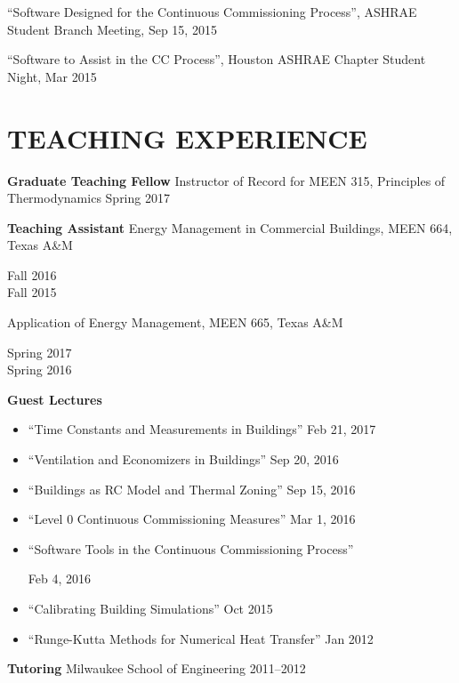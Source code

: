 \documentclass[margin]{res} %
\begin{document}
\begin{resume}
``Software Designed for the Continuous Commissioning Process'', ASHRAE Student Branch Meeting, Sep 15, 2015

``Software to Assist in the CC Process'', Houston ASHRAE Chapter Student Night, Mar 2015


\section{TEACHING EXPERIENCE}
\textbf{Graduate Teaching Fellow} \newline
Instructor of Record for MEEN 315, Principles of Thermodynamics \hfill Spring 2017

\textbf{Teaching Assistant}\newline
Energy Management in Commercial Buildings, MEEN 664, Texas A\&M \hfill \parbox[t]{1.5cm}{\raggedleft Fall 2016 \\ Fall 2015} \par

\vspace{10pt}

Application of Energy Management, MEEN 665, Texas A\&M \hfill \parbox[t]{2cm}{\raggedleft Spring 2017 \\ Spring 2016}

\vspace{10pt}
\textbf{Guest Lectures}
\begin{itemize}
    \item ``Time Constants and Measurements in Buildings'' \hfill Feb 21, 2017
    \item ``Ventilation and Economizers in Buildings'' \hfill Sep 20, 2016
    \item ``Buildings as RC Model and Thermal Zoning'' \hfill Sep 15, 2016
    \item ``Level 0 Continuous Commissioning Measures'' \hfill Mar 1, 2016
    \item  \parbox{10cm}{``Software Tools in the Continuous Commissioning Process''} \hfill Feb 4, 2016
    \item ``Calibrating Building Simulations'' \hfill Oct 2015
    \item ``Runge-Kutta Methods for Numerical Heat Transfer'' \hfill Jan 2012
\end{itemize}

\medskip


\textbf{Tutoring} \newline
Milwaukee School of Engineering \hfill 2011--2012


\end{resume}
\end{document}
